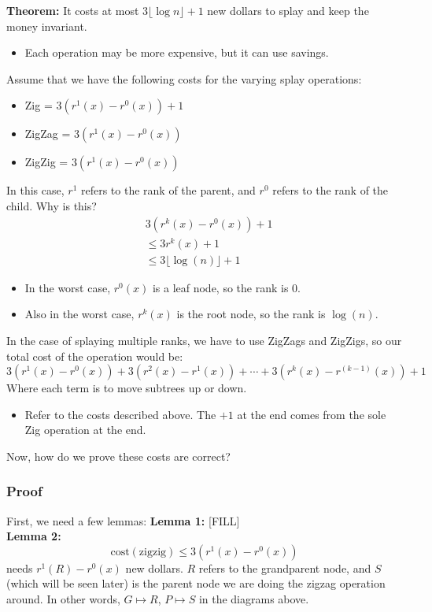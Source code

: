 \documentclass[10pt]{article}
\begin{document}
\textbf{Theorem:} It costs at most $3 \lfloor \log n \rfloor + 1$ new dollars to splay and keep the money invariant.
\begin{itemize}
	\item Each operation may be more expensive, but it can use savings.
\end{itemize}
Assume that we have the following costs for the varying splay operations:
\begin{itemize}
	\item Zig = $3(r^1(x) - r^0(x)) + 1$
	\item ZigZag = $3(r^1(x) - r^0(x))$
	\item ZigZig = $3(r^1(x) - r^0(x))$
\end{itemize}
In this case, $r^1$ refers to the rank of the parent, and $r^0$ refers to the rank of the child.  Why is this?
\begin{align*}
    &3(r^k(x) - r^0(x)) + 1 \\ 
    &\leq 3 r^k(x) + 1 \\
    &\leq 3 \lfloor \log(n) \rfloor + 1
\end{align*}
\begin{itemize}
	\item In the worst case, $r^0(x)$ is a leaf node, so the rank is 0.
	\item Also in the worst case, $r^k(x)$ is the root node, so the rank is $\log(n)$.
\end{itemize}
In the case of splaying multiple ranks, we have to use ZigZags and ZigZigs, so our total cost of the operation would be:
\[3(r^1(x) - r^0(x)) + 3(r^2(x) - r^1(x)) + \cdots + 3(r^k(x) - r^{(k - 1)}(x)) + 1\]
Where each term is to move subtrees up or down.
\begin{itemize}
	\item Refer to the costs described above.  The $+1$ at the end comes from the sole Zig operation at the end.
\end{itemize}

Now, how do we prove these costs are correct?
\subsubsection*{Proof}
First, we need a few lemmas:
\textbf{Lemma 1:} [FILL]\\
\textbf{Lemma 2:}
\[\text{cost}(\text{zigzig}) \leq 3(r^1(x) - r^0(x))\]
needs $r^1(R) - r^0(x)$ new dollars.  $R$ refers to the grandparent node, and $S$ (which will be seen later) is the parent node we are doing the zigzag operation around.  In other words, $G \mapsto R$, $P \mapsto S$ in the diagrams above.
\end{document}
